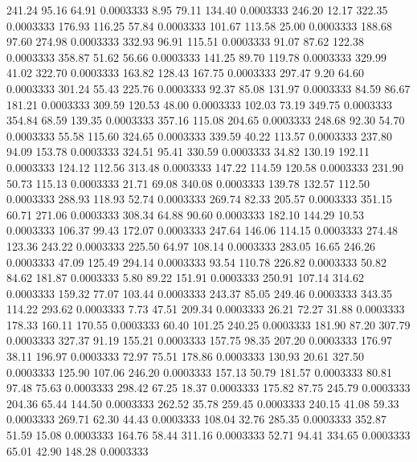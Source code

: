  241.24   95.16   64.91   0.0003333
   8.95   79.11  134.40   0.0003333
 246.20   12.17  322.35   0.0003333
 176.93  116.25   57.84   0.0003333
 101.67  113.58   25.00   0.0003333
 188.68   97.60  274.98   0.0003333
 332.93   96.91  115.51   0.0003333
  91.07   87.62  122.38   0.0003333
 358.87   51.62   56.66   0.0003333
 141.25   89.70  119.78   0.0003333
 329.99   41.02  322.70   0.0003333
 163.82  128.43  167.75   0.0003333
 297.47    9.20   64.60   0.0003333
 301.24   55.43  225.76   0.0003333
  92.37   85.08  131.97   0.0003333
  84.59   86.67  181.21   0.0003333
 309.59  120.53   48.00   0.0003333
 102.03   73.19  349.75   0.0003333
 354.84   68.59  139.35   0.0003333
 357.16  115.08  204.65   0.0003333
 248.68   92.30   54.70   0.0003333
  55.58  115.60  324.65   0.0003333
 339.59   40.22  113.57   0.0003333
 237.80   94.09  153.78   0.0003333
 324.51   95.41  330.59   0.0003333
  34.82  130.19  192.11   0.0003333
 124.12  112.56  313.48   0.0003333
 147.22  114.59  120.58   0.0003333
 231.90   50.73  115.13   0.0003333
  21.71   69.08  340.08   0.0003333
 139.78  132.57  112.50   0.0003333
 288.93  118.93   52.74   0.0003333
 269.74   82.33  205.57   0.0003333
 351.15   60.71  271.06   0.0003333
 308.34   64.88   90.60   0.0003333
 182.10  144.29   10.53   0.0003333
 106.37   99.43  172.07   0.0003333
 247.64  146.06  114.15   0.0003333
 274.48  123.36  243.22   0.0003333
 225.50   64.97  108.14   0.0003333
 283.05   16.65  246.26   0.0003333
  47.09  125.49  294.14   0.0003333
  93.54  110.78  226.82   0.0003333
  50.82   84.62  181.87   0.0003333
   5.80   89.22  151.91   0.0003333
 250.91  107.14  314.62   0.0003333
 159.32   77.07  103.44   0.0003333
 243.37   85.05  249.46   0.0003333
 343.35  114.22  293.62   0.0003333
   7.73   47.51  209.34   0.0003333
  26.21   72.27   31.88   0.0003333
 178.33  160.11  170.55   0.0003333
  60.40  101.25  240.25   0.0003333
 181.90   87.20  307.79   0.0003333
 327.37   91.19  155.21   0.0003333
 157.75   98.35  207.20   0.0003333
 176.97   38.11  196.97   0.0003333
  72.97   75.51  178.86   0.0003333
 130.93   20.61  327.50   0.0003333
 125.90  107.06  246.20   0.0003333
 157.13   50.79  181.57   0.0003333
  80.81   97.48   75.63   0.0003333
 298.42   67.25   18.37   0.0003333
 175.82   87.75  245.79   0.0003333
 204.36   65.44  144.50   0.0003333
 262.52   35.78  259.45   0.0003333
 240.15   41.08   59.33   0.0003333
 269.71   62.30   44.43   0.0003333
 108.04   32.76  285.35   0.0003333
 352.87   51.59   15.08   0.0003333
 164.76   58.44  311.16   0.0003333
  52.71   94.41  334.65   0.0003333
  65.01   42.90  148.28   0.0003333
